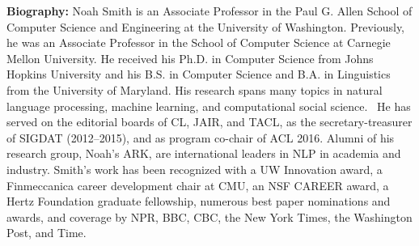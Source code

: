 {\bfseries Biography:} Noah Smith is an Associate Professor in the Paul G. Allen School of Computer Science and Engineering at the University of Washington. Previously, he was an Associate Professor in the School of Computer Science at Carnegie Mellon University. He received his Ph.D. in Computer Science from Johns Hopkins University and his B.S. in Computer Science and B.A. in Linguistics from the University of Maryland. His research spans many topics in natural language processing, machine learning, and computational social science.  He has served on the editorial boards of CL, JAIR, and TACL, as the secretary-treasurer of SIGDAT (2012–2015), and as program co-chair of ACL 2016. Alumni of his research group, Noah’s ARK, are international leaders in NLP in academia and industry. Smith’s work has been recognized with a UW Innovation award, a Finmeccanica career development chair at CMU, an NSF CAREER award, a Hertz Foundation graduate fellowship, numerous best paper nominations and awards, and coverage by NPR, BBC, CBC, the New York Times, the Washington Post, and Time.

\newpage
